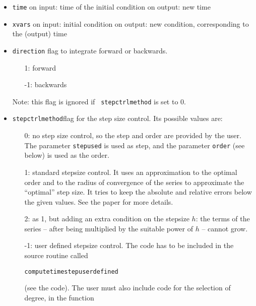 \documentclass[10pt]{article}
\theoremstyle{remark}
\begin{document}
\begin{itemize}
\item {\tt time}\newline
  on input:  time of the initial condition\newline
  on output: new time
\item {\tt xvars}\newline
  on input:  initial condition\newline
  on output: new condition, corresponding to the (output) time
\item {\tt direction}\newline
  flag to integrate forward or backwards.
  \begin{itemize}
  \item[\phantom{-}1:] forward
  \item[-1:] backwards
  \end{itemize}
  Note: this flag is ignored if {\tt
    stepctrlmethod} is set to 0.
\item {\tt stepctrlmethod}\newline flag for the
  step size control. Its possible values are:
  \begin{itemize}
  \item[\phantom{-}0:] no step size control, so the step and order are
    provided by the user. The parameter \verb+stepused+ is used as
    step, and the parameter \verb+order+ (see below) is used as the
    order.
  \item[\phantom{-}1:] standard stepsize control. It uses an
    approximation to the optimal order and to the radius of
    convergence of the series to approximate the ``optimal'' step
    size. It tries to keep the absolute and relative errors below the
    given values. See the paper \cite{JZ} for more details.
  \item[\phantom{-}2:] as 1, but adding an extra condition on the
    stepsize $h$: the terms of the series -- after being multiplied by
    the suitable power of $h$ -- cannot grow.
  \item[-1:] user defined stepsize control. The code has to be
    included in the source routine called
    \begin{center}
     {\tt computetimestepuserdefined}
    \end{center}
    (see the code). The user must also include code for the selection
    of degree, in the function 
    \begin{center}

\end{center}
\end{itemize}
\end{itemize}
\end{document}
